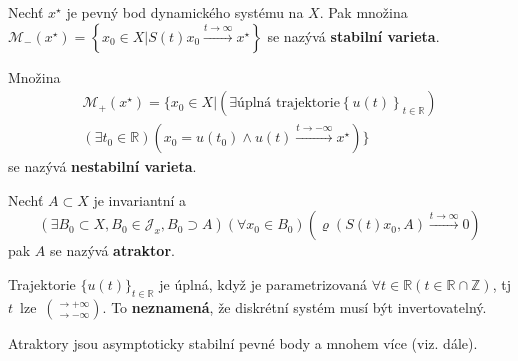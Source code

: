 \documentclass[../main.tex]{subfiles}
\begin{document}
\begin{definition}
    Nechť $x^\star$ je pevný bod dynamického systému na $X$. Pak množina $\mathcal{M}_- (x^\star) = \left\{x_0 \in X| S(t)x_0 \overset{t\rightarrow\infty}{\longrightarrow} x^\star\right\}$ se nazývá \textbf{stabilní varieta}.
    
    Množina
    \begin{multline*}
    \mathcal{M}_+ (x^\star) = \{x_0\in X| (\exists \text{úplná trajektorie} \left\{u(t)\right\}_{t\in\mathbb{R}})\\(\exists t_0 \in \mathbb{R}) (x_0 = u (t_0) \wedge u(t) \overset{t\rightarrow - \infty}{\longrightarrow} x^\star)\}
    \end{multline*}
    se nazývá \textbf{nestabilní varieta}.

    Nechť $A\subset X$ je invariantní a 
    \begin{equation*}
    \left(\exists B_0 \subset X, B_0 \in \mathcal{J}_x, B_0 \supset A\right) \left(\forall x_0 \in B_0\right) \left(\varrho(S(t)x_0, A) \overset{t\rightarrow\infty}{\longrightarrow} 0\right)
    \end{equation*}
     pak $A$ se nazývá \textbf{atraktor}.

\end{definition}


\begin{remark}
    Trajektorie $\{u(t)\}_{t\in\mathbb{R}}$ je úplná, když je 
    parametrizovaná $\forall t \in \mathbb{R} (t \in \mathbb{R} \cap\mathbb{Z})$, tj $t$~lze~$\binom{\rightarrow + \infty}{\rightarrow - \infty}$. 
    To \textbf{neznamená}, že diskrétní systém musí být invertovatelný.

    Atraktory jsou asymptoticky stabilní pevné body a mnohem více (viz. dále).
\end{remark}
\end{document}
